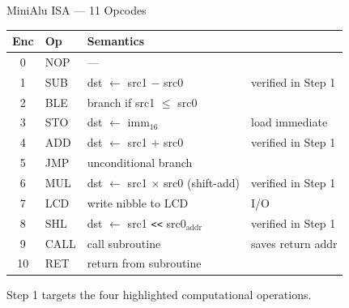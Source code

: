 \documentclass[aspectratio=169]{beamer}
\begin{document}
\begin{frame}{MiniAlu ISA --- 11 Opcodes}
  \begin{center}
  \small
  \begin{tabular}{cll@{\hspace{2em}}l}
    \toprule
    \textbf{Enc} & \textbf{Op} & \textbf{Semantics} & \textbf{} \\
    \midrule
    0  & NOP  & ---                             & \\
    1  & \alert{SUB}  & dst $\leftarrow$ src1 $-$ src0  & \alert{verified in Step 1} \\
    2  & BLE  & branch if src1 $\leq$ src0      & \\
    3  & STO  & dst $\leftarrow$ imm$_{16}$     & load immediate \\
    4  & \alert{ADD}  & dst $\leftarrow$ src1 $+$ src0  & \alert{verified in Step 1} \\
    5  & JMP  & unconditional branch            & \\
    6  & \alert{MUL}  & dst $\leftarrow$ src1 $\times$ src0 (shift-add) & \alert{verified in Step 1} \\
    7  & LCD  & write nibble to LCD             & I/O \\
    8  & \alert{SHL}  & dst $\leftarrow$ src1 \texttt{<<} src0$_{\text{addr}}$ & \alert{verified in Step 1} \\
    9  & CALL & call subroutine                 & saves return addr \\
    10 & RET  & return from subroutine          & \\
    \bottomrule
  \end{tabular}
  \end{center}
  \vspace{0.4em}
  \centering\small Step 1 targets the four \alert{highlighted} computational operations.
\end{frame}
\end{document}
